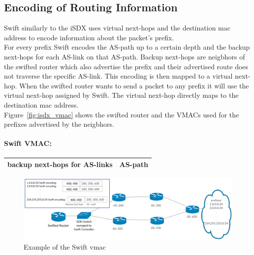 \subsection{\label{chapter2:Swift:encoding_of_routing_information}Encoding of Routing Information}
Swift similarly to the iSDX uses virtual next-hops and the destination mac address to encode information about the packet's prefix.\\
For every prefix Swift encodes the AS-path up to a certain depth and the backup next-hops for each AS-link on that AS-path. Backup next-hops are neigbhors of the swifted router which also advertise the prefix and their advertised route does not traverse the specific AS-link. This encoding is then mapped to a virtual next-hop. When the swifted router wants to send a packet to any prefix it will use the virtual next-hop assigned by Swift. The virtual next-hop directly maps to the destination mac address. \\
Figure~\ref{fig:isdx_vmac} shows the swifted router and the VMACs used for the prefixes advertised by the neigbhors.

\paragraph{\label{chapter2:Swift:Swift vmac}Swift VMAC:}

\begin{tabular}{|r|l|}
  \hline 
  backup next-hops for AS-links & AS-path \\
  \hline
\end{tabular}


\begin{figure}[h]
\center
\includegraphics[scale = 0.24]{Figures/bckgrnd_swift_topology.pdf}
\caption{Example of the Swift vmac}
\label{fig:swift_vmac}
\end{figure}


